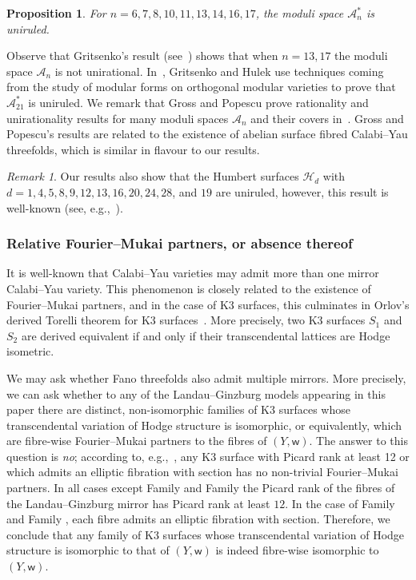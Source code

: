 \documentclass[10pt]{amsart}
\numberwithin{equation}{section}
\theoremstyle{plain}
\newtheorem{proposition}[theorem]{Proposition}
\theoremstyle{definition}
\theoremstyle{remark}
\newtheorem{remark}[theorem]{Remark}
\begin{document}
\begin{proposition}
  For \(n = 6, 7, 8, 10, 11, 13, 14, 16, 17\), the moduli space \(\mathcal{A}_n^*\) is uniruled.
\end{proposition}

Observe that Gritsenko's result (see~\cite{gritsenko1994irrationality}) shows that when \(n=13,17\) the moduli space \(\mathcal{A}_n\) is not unirational. In~\cite{gritsenko2014uniruledness}, Gritsenko and Hulek use techniques coming from the study of modular forms on orthogonal modular varieties to prove that \(\mathcal{A}_{21}^*\) is uniruled. We remark that Gross and Popescu prove rationality and unirationality results for many moduli spaces \(\mathcal{A}_n\) and their covers in~\cite{gross2001calabi,gross2011calabi}. Gross and Popescu's results are related to the existence of abelian surface fibred Calabi--Yau threefolds, which is similar in flavour to our results.

\begin{remark}
  Our results also show that the Humbert surfaces \(\mathcal{H}_d\) with \(d = 1, 4, 5, 8, 9, 12, 13 , 16, 20, 24, 28\), and \(19\) are uniruled, however, this result is well-known (see, e.g.,~\cite{elkies2014k3}).
\end{remark}

\subsubsection{Relative Fourier--Mukai partners, or absence thereof} It is well-known that Calabi--Yau varieties may admit more than one mirror Calabi--Yau variety. This phenomenon is closely related to the existence of Fourier--Mukai partners, and in the case of K3 surfaces, this culminates in Orlov's derived Torelli theorem for K3 surfaces~\cite{orlov1997equivalences}. More precisely, two K3 surfaces \(S_1\) and \(S_2\) are derived equivalent if and only if their transcendental lattices are Hodge isometric.

We may ask whether Fano threefolds also admit multiple mirrors. More precisely, we can ask whether to any of the Landau--Ginzburg models appearing in this paper there are distinct, non-isomorphic families of K3 surfaces whose transcendental variation of Hodge structure is isomorphic, or equivalently, which are fibre-wise Fourier--Mukai partners to the fibres of \((Y,\mathsf{w})\). The answer to this question is \emph{no}; according to, e.g.,~\cite[Corollary 3.8]{huybrechts2016K3}, any K3 surface with Picard rank at least 12 or which admits an elliptic fibration with section has no non-trivial Fourier--Mukai partners. In all cases except Family  and Family  the Picard rank of the fibres of the Landau--Ginzburg mirror has Picard rank at least \(12\). In the case of Family  and Family , each fibre admits an elliptic fibration with section. Therefore, we conclude that any family of K3 surfaces whose transcendental variation of Hodge structure is isomorphic to that of \((Y,\mathsf{w})\) is indeed fibre-wise isomorphic to \((Y,\mathsf{w})\).
\end{document}
